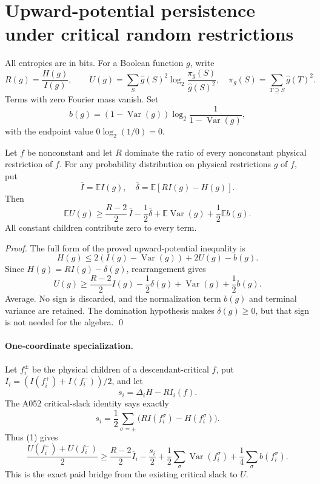 \section*{Upward-potential persistence under critical random restrictions}

All entropies are in bits.  For a Boolean function $g$, write
\[
 R(g)=\frac{H(g)}{I(g)},\qquad
 U(g)=\sum_S \widehat g(S)^2\log_2\frac{\pi_g(S)}{\widehat g(S)^2},
 \quad \pi_g(S)=\sum_{T\supseteq S}\widehat g(T)^2.
\]
Terms with zero Fourier mass vanish.  Set
\[
 b(g)=(1-\operatorname{Var}(g))
       \log_2\frac1{1-\operatorname{Var}(g)},
\]
with the endpoint value $0\log_2(1/0)=0$.

\begin{theorem}
Let $f$ be nonconstant and let $R$ dominate the ratio of every nonconstant
physical restriction of $f$.  For any probability distribution on physical
restrictions $g$ of $f$, put
\[
 \overline I=\mathbb E I(g),\quad
 \overline\delta=\mathbb E[RI(g)-H(g)].
\]
Then
\[
 \boxed{\quad
 \mathbb E U(g)\ge
 \frac{R-2}{2}\,\overline I-\frac12\overline\delta
 +\mathbb E\operatorname{Var}(g)+\frac12\mathbb E b(g).
 \quad}                                                   \tag{1}
\]
All constant children contribute zero to every term.
\end{theorem}

\begin{proof}
The full form of the proved upward-potential inequality is
\[
 H(g)\le2(I(g)-\operatorname{Var}(g))+2U(g)-b(g).
\]
Since $H(g)=RI(g)-\delta(g)$, rearrangement gives
\[
 U(g)\ge \frac{R-2}{2}I(g)-\frac12\delta(g)
          +\operatorname{Var}(g)+\frac12b(g).
\]
Average.  No sign is discarded, and the normalization term $b(g)$ and
terminal variance are retained.  The domination hypothesis makes
$\delta(g)\ge0$, but that sign is not needed for the algebra.  \qed
\end{proof}

\paragraph{One-coordinate specialization.}
Let $f_i^\pm$ be the physical children of a descendant-critical $f$, put
$\overline I_i=(I(f_i^+)+I(f_i^-))/2$, and let
\[
 s_i=\Delta_iH-RI_i(f).
\]
The A052 critical-slack identity says exactly
\[
 s_i=\frac12\sum_{\sigma=\pm}
       \bigl(RI(f_i^\sigma)-H(f_i^\sigma)\bigr).
\]
Thus (1) gives
\[
 \frac{U(f_i^+)+U(f_i^-)}2\ge
 \frac{R-2}{2}\overline I_i-\frac{s_i}{2}
 +\frac12\sum_\sigma\operatorname{Var}(f_i^\sigma)
 +\frac14\sum_\sigma b(f_i^\sigma).                       \tag{2}
\]
This is the exact paid bridge from the existing critical slack to $U$.

